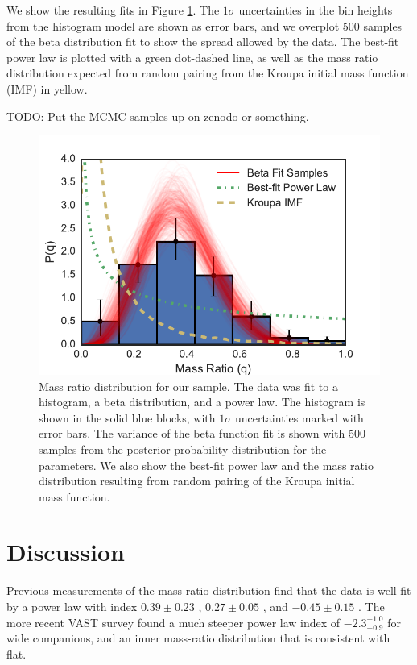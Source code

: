 \documentclass{emulateapj}
\begin{document}
We show the resulting fits in Figure \ref{fig:mrd}. The $1\sigma$ uncertainties in the bin heights from the histogram model are shown as error bars, and we overplot 500 samples of the beta distribution fit to show the spread allowed by the data. The best-fit power law is plotted with a green dot-dashed line, as well as the mass ratio distribution expected from random pairing from the Kroupa initial mass function (IMF) in yellow.

TODO: Put the MCMC samples up on zenodo or something.

\begin{figure}
\includegraphics[width=\columnwidth]{MRD_total.pdf}
\caption{Mass ratio distribution for our sample. The data was fit to a histogram, a beta distribution, and a power law. The histogram is shown in the solid blue blocks, with $1 \sigma$ uncertainties marked with error bars. The variance of the beta function fit is shown with 500 samples from the posterior probability distribution for the parameters. We also show the best-fit power law and the mass ratio distribution resulting from random pairing of the Kroupa initial mass function.}
\label{fig:mrd}
\end{figure}




\section{Discussion}
\label{sec:discussion}

Previous measurements of the mass-ratio distribution find that the data is well fit by a power law with index $0.39 \pm 0.23$ \citep[M dwarf stars][]{Delfosse2004}, $0.27 \pm 0.05$ \citep[Solar type stars][]{Duchene2013}, and $-0.45 \pm 0.15$ \citep[intermediate-mass stars][]{Kouwenhoven2007}. The more recent VAST survey found a much steeper power law index of $-2.3^{+1.0}_{-0.9}$ for wide companions, and an inner mass-ratio distribution that is consistent with flat.
\end{document}
